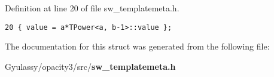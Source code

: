 Definition at line 20 of file sw\_\-templatemeta.h.

\begin{Code}\begin{verbatim}20 { value = a*TPower<a, b-1>::value };
\end{verbatim}
\end{Code}




The documentation for this struct was generated from the following file:\begin{CompactItemize}
\item 
Gyulassy/opacity3/src/{\bf sw\_\-templatemeta.h}\end{CompactItemize}
